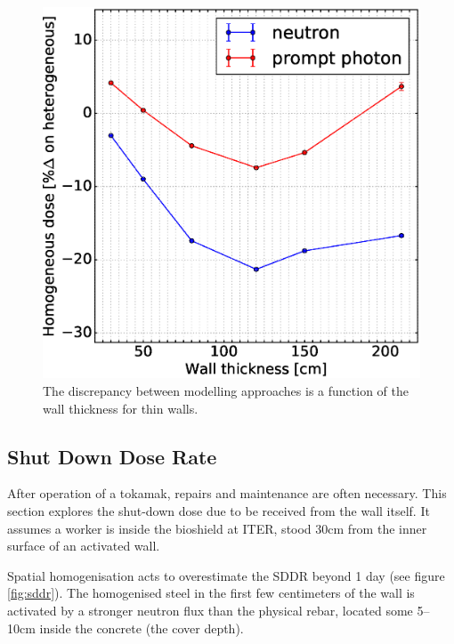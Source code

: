 \begin{figure}[H]
	\includegraphics[width=\textwidth]{wall_thickness_dose_discrep}
	\caption{The discrepancy between modelling approaches is a function of the wall thickness for thin walls.}
	\label{fig:dose_discrepancy}
\end{figure}

\subsection{Shut Down Dose Rate}
\label{subsec:sddr}

After operation of a tokamak, repairs and maintenance are often necessary. This section explores the shut-down dose due to be received from the wall itself. It assumes a worker is inside the bioshield at ITER, stood 30cm from the inner surface of an activated wall.\par
Spatial homogenisation acts to overestimate the SDDR beyond 1 day (see figure \ref{fig:sddr}). The homogenised steel in the first few centimeters of the wall is activated by a stronger neutron flux than the physical rebar, located some 5--10cm inside the concrete (the cover depth).


